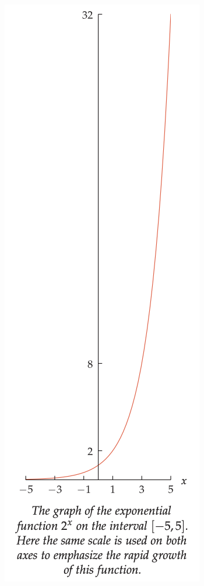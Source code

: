 \documentclass{beamer}
\begin{document}
\begin{frame}
\begin{columns}
    \begin{column}{0.5\textwidth}
      \begin{figure}
        \centering 
        \includegraphics[scale=0.2]{exp-vs-poly2.png}
       \end{figure}      
    \end{column}
  \end{columns}
\end{frame}
\end{document}
